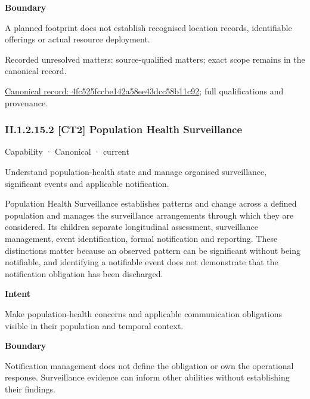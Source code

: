 \textbf{Boundary}



A planned footprint does not establish recognised location records, identifiable offerings or actual resource deployment.


{\small Recorded unresolved matters: source-qualified matters; exact scope remains in the canonical record.}\par
{\footnotesize \href{../../../../../../../continuum/strategy/capability/4fc525fccbe142a58ee43dcc58b11c92.md}{Canonical record: 4fc525fccbe142a58ee43dcc58b11c92}; full qualifications and provenance.}\par
\subsubsection*{II.1.2.15.2 [CT2] Population Health Surveillance}
\label{navigation:II.1.2.15.2}

\label{element:83e568fa8af14d7791a7253765ea390f}
{\small Capability · Canonical · current}\par

Understand population-health state and manage organised surveillance, significant events and applicable notification.



Population Health Surveillance establishes patterns and change across a defined population and manages the surveillance arrangements through which they are considered. Its children separate longitudinal assessment, surveillance management, event identification, formal notification and reporting. These distinctions matter because an observed pattern can be significant without being notifiable, and identifying a notifiable event does not demonstrate that the notification obligation has been discharged.



\textbf{Intent}



Make population-health concerns and applicable communication obligations visible in their population and temporal context.



\textbf{Boundary}



Notification management does not define the obligation or own the operational response. Surveillance evidence can inform other abilities without establishing their findings.


